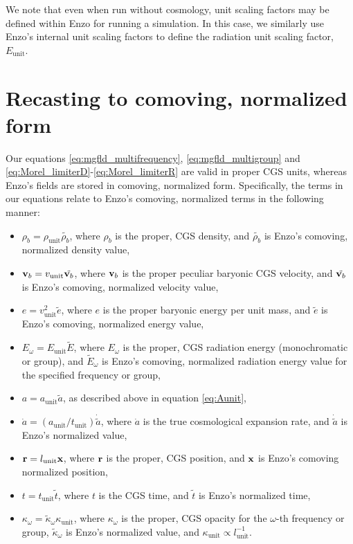 \documentclass[10pt]{article}
\renewcommand{\(}{\left(}
\renewcommand{\)}{\right)}
\newcommand{\vb}{{\bf v}_b}
\newcommand{\xvec}{{\bf x}}
\newcommand{\rvec}{{\bf r}}
\newcommand{\adot}{\dot{a}}
\newcommand{\rhob}{\rho_b}
\newcommand{\Aunit}{a_{\text{unit}}}
\newcommand{\Lunit}{l_{\text{unit}}}
\newcommand{\Dunit}{\rho_{\text{unit}}}
\newcommand{\Tunit}{t_{\text{unit}}}
\newcommand{\Vunit}{v_{\text{unit}}}
\newcommand{\Eunit}{E_{\text{unit}}}
\newcommand{\Kunit}{\kappa_{\text{unit}}}
\newcommand{\tK}{\tilde{\kappa}}
\newcommand{\tT}{\tilde{t}}
\newcommand{\tE}{\tilde{E}}
\newcommand{\tRho}{\tilde{\rhob}}
\newcommand{\tA}{\tilde{a}}
\begin{document}
We note that even when run without cosmology, unit scaling factors may
be defined within Enzo for running a simulation.  In this case, we
similarly use Enzo's internal unit scaling factors to define the
radiation unit scaling factor, $\Eunit$. 





\section{Recasting to comoving, normalized form}
\label{sec:comoving_eqn}

Our equations \eqref{eq:mgfld_multifrequency},
\eqref{eq:mgfld_multigroup} and
\eqref{eq:Morel_limiterD}-\eqref{eq:Morel_limiterR} are valid in
proper CGS units, whereas Enzo's fields are stored in comoving,
normalized form.  Specifically, the terms in our equations relate to
Enzo's comoving, normalized terms in the following manner: 
\begin{itemize}
\item $\rhob = \Dunit \tRho$, where $\rhob$ is the proper, CGS
  density, and $\tRho$ is Enzo's comoving, normalized
  density value,
\item $\vb = \Vunit \tilde{\vb}$, where $\vb$ is the proper peculiar
  baryonic CGS velocity, and $\tilde{\vb}$ is Enzo's comoving,
  normalized velocity value,
\item $e = \Vunit^2 \tilde{e}$, where $e$ is the proper
  baryonic energy per unit mass, and $\tilde{e}$ is Enzo's comoving,
  normalized energy value,
\item $E_{\omega} = \Eunit \tE$, where $E_{\omega}$ is the proper, CGS radiation
  energy (monochromatic or group), and $\tE_{\omega}$ is Enzo's comoving,
  normalized radiation energy value for the specified frequency or
  group,
\item $a = \Aunit \tA$, as described above in equation
  \eqref{eq:Aunit},
\item $\adot = \left(\Aunit/\Tunit\right) \dot{\tA}$, where $\adot$ is
  the true cosmological expansion rate, and $\dot{\tA}$ is Enzo's
  normalized value,
\item $\rvec = \Lunit \xvec$, where $\rvec$ is the
  proper, CGS position, and $\xvec$ is Enzo's comoving normalized position,
\item $t = \Tunit \tT$, where $t$ is the CGS time, and $\tT$ is Enzo's
  normalized time,
\item $\kappa_{\omega} = \tK_{\omega} \Kunit$, where $\kappa_{\omega}$ is the proper, CGS
  opacity for the $\omega$-th frequency or group, $\tK_{\omega}$ is Enzo's
  normalized value, and $\Kunit \propto \Lunit^{-1}$.
\end{itemize}
\end{document}
